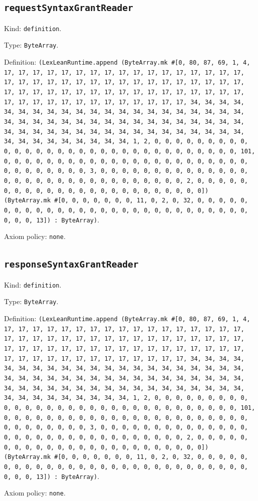 \documentclass[11pt]{article}
\begin{document}
\subsection*{\texttt{requestSyntaxGrantReader}}
\noindent Kind: \texttt{definition}.\par
\noindent Type: \texttt{ByteArray}.\par
\noindent Definition: \texttt{(LexLeanRuntime.append (ByteArray.mk \#[0, 80, 87, 69, 1, 4, 17, 17, 17, 17, 17, 17, 17, 17, 17, 17, 17, 17, 17, 17, 17, 17, 17, 17, 17, 17, 17, 17, 17, 17, 17, 17, 17, 17, 17, 17, 17, 17, 17, 17, 17, 17, 17, 17, 17, 17, 17, 17, 17, 17, 17, 17, 17, 17, 17, 17, 17, 17, 17, 17, 17, 17, 17, 17, 17, 17, 17, 17, 17, 17, 34, 34, 34, 34, 34, 34, 34, 34, 34, 34, 34, 34, 34, 34, 34, 34, 34, 34, 34, 34, 34, 34, 34, 34, 34, 34, 34, 34, 34, 34, 34, 34, 34, 34, 34, 34, 34, 34, 34, 34, 34, 34, 34, 34, 34, 34, 34, 34, 34, 34, 34, 34, 34, 34, 34, 34, 34, 34, 34, 34, 34, 34, 34, 34, 1, 2, 0, 0, 0, 0, 0, 0, 0, 0, 0, 0, 0, 0, 0, 0, 0, 0, 0, 0, 0, 0, 0, 0, 0, 0, 0, 0, 0, 0, 0, 0, 0, 101, 0, 0, 0, 0, 0, 0, 0, 0, 0, 0, 0, 0, 0, 0, 0, 0, 0, 0, 0, 0, 0, 0, 0, 0, 0, 0, 0, 0, 0, 0, 0, 3, 0, 0, 0, 0, 0, 0, 0, 0, 0, 0, 0, 0, 0, 0, 0, 0, 0, 0, 0, 0, 0, 0, 0, 0, 0, 0, 0, 0, 0, 0, 0, 2, 0, 0, 0, 0, 0, 0, 0, 0, 0, 0, 0, 0, 0, 0, 0, 0, 0, 0, 0, 0, 0, 0, 0, 0]) (ByteArray.mk \#[0, 0, 0, 0, 0, 0, 0, 11, 0, 2, 0, 32, 0, 0, 0, 0, 0, 0, 0, 0, 0, 0, 0, 0, 0, 0, 0, 0, 0, 0, 0, 0, 0, 0, 0, 0, 0, 0, 0, 0, 0, 0, 0, 13]) : ByteArray)}.\par
\noindent Axiom policy: \texttt{none}.\par
\subsection*{\texttt{responseSyntaxGrantReader}}
\noindent Kind: \texttt{definition}.\par
\noindent Type: \texttt{ByteArray}.\par
\noindent Definition: \texttt{(LexLeanRuntime.append (ByteArray.mk \#[0, 80, 87, 69, 1, 4, 17, 17, 17, 17, 17, 17, 17, 17, 17, 17, 17, 17, 17, 17, 17, 17, 17, 17, 17, 17, 17, 17, 17, 17, 17, 17, 17, 17, 17, 17, 17, 17, 17, 17, 17, 17, 17, 17, 17, 17, 17, 17, 17, 17, 17, 17, 17, 17, 17, 17, 17, 17, 17, 17, 17, 17, 17, 17, 17, 17, 17, 17, 17, 17, 34, 34, 34, 34, 34, 34, 34, 34, 34, 34, 34, 34, 34, 34, 34, 34, 34, 34, 34, 34, 34, 34, 34, 34, 34, 34, 34, 34, 34, 34, 34, 34, 34, 34, 34, 34, 34, 34, 34, 34, 34, 34, 34, 34, 34, 34, 34, 34, 34, 34, 34, 34, 34, 34, 34, 34, 34, 34, 34, 34, 34, 34, 34, 34, 1, 2, 0, 0, 0, 0, 0, 0, 0, 0, 0, 0, 0, 0, 0, 0, 0, 0, 0, 0, 0, 0, 0, 0, 0, 0, 0, 0, 0, 0, 0, 0, 0, 101, 0, 0, 0, 0, 0, 0, 0, 0, 0, 0, 0, 0, 0, 0, 0, 0, 0, 0, 0, 0, 0, 0, 0, 0, 0, 0, 0, 0, 0, 0, 0, 3, 0, 0, 0, 0, 0, 0, 0, 0, 0, 0, 0, 0, 0, 0, 0, 0, 0, 0, 0, 0, 0, 0, 0, 0, 0, 0, 0, 0, 0, 0, 0, 2, 0, 0, 0, 0, 0, 0, 0, 0, 0, 0, 0, 0, 0, 0, 0, 0, 0, 0, 0, 0, 0, 0, 0, 0]) (ByteArray.mk \#[0, 0, 0, 0, 0, 0, 0, 11, 0, 2, 0, 32, 0, 0, 0, 0, 0, 0, 0, 0, 0, 0, 0, 0, 0, 0, 0, 0, 0, 0, 0, 0, 0, 0, 0, 0, 0, 0, 0, 0, 0, 0, 0, 13]) : ByteArray)}.\par
\noindent Axiom policy: \texttt{none}.\par
\end{document}
